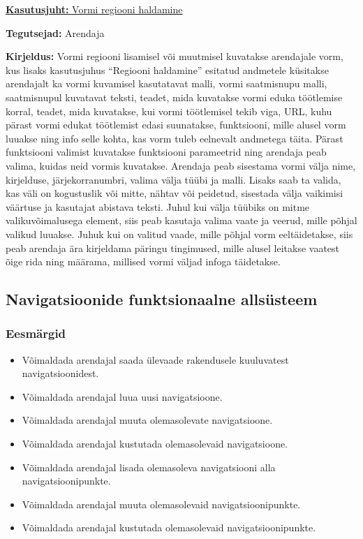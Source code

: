 \documentclass[a4paper,12pt]{article} %
\begin{document}
\underline{\textbf{Kasutusjuht:} Vormi regiooni haldamine}
\par
\textbf{Tegutsejad:} Arendaja
\par
\textbf{Kirjeldus:} Vormi regiooni lisamisel või muutmisel kuvatakse arendajale vorm, kus lisaks kasutusjuhus ``Regiooni haldamine'' esitatud andmetele küsitakse arendajalt ka vormi kuvamisel kasutatavat malli, vormi saatmisnupu malli, saatmisnupul kuvatavat teksti, teadet, mida kuvatakse vormi eduka töötlemise korral, teadet, mida kuvatakse, kui vormi töötlemisel tekib viga, URL, kuhu pärast vormi edukat töötlemist edasi suunatakse, funktsiooni, mille alusel vorm luuakse ning info selle kohta, kas vorm tuleb eelnevalt andmetega täita. Pärast funktsiooni valimist kuvatakse funktsiooni parameetrid ning arendaja peab valima, kuidas neid vormis kuvatakse. Arendaja peab sisestama vormi välja nime, kirjelduse, järjekorranumbri, valima välja tüübi ja malli. Lisaks saab ta valida, kas väli on kogustuslik või mitte, nähtav või peidetud, sisestada välja vaikimisi väärtuse ja kasutajat abistava teksti. Juhul kui välja tüübiks on mitme valikuvõimalusega element, siis peab kasutaja valima vaate ja veerud, mille põhjal valikud luuakse. Juhuk kui on valitud vaade, mille põhjal vorm eeltäidetakse, siis peab arendaja ära kirjeldama päringu tingimused, mille alusel leitakse vaatest õige rida ning määrama, millised vormi väljad infoga täidetakse.

\subsection{Navigatsioonide funktsionaalne allsüsteem}
\subsubsection{Eesmärgid}
\begin{itemize}
\item Võimaldada arendajal saada ülevaade rakendusele kuuluvatest navigatsioonidest.
\item Võimaldada arendajal luua uusi navigatsioone.
\item Võimaldada arendajal muuta olemasolevate navigatsioone.
\item Võimaldada arendajal kustutada olemasolevaid navigatsioone.
\item Võimaldada arendajal lisada olemasoleva navigatsiooni alla navigatsioonipunkte.
\item Võimaldada arendajal muuta olemasolevaid navigatsioonipunkte.
\item Võimaldada arendajal kustutada olemasolevaid navigatsioonipunkte.
\end{itemize}
\end{document}
